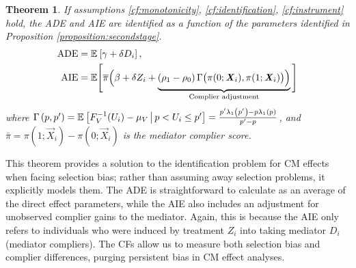 \newtheorem{theoremCF}{Theorem}
\renewcommand\thetheoremCF{CF}
\begin{theoremCF}
    \label{thm:cf-identification}
    If assumptions \ref{cf:monotonicity}, \ref{cf:identification}, \ref{cf:instrument} hold, the ADE and AIE are identified as a function of the parameters identified in Proposition \ref{proposition:secondstage}.
    \begin{align*}
    \text{ADE}
        &= \mathbb{E}_{} \left[ \gamma + \delta D_i \right], \\
    \text{AIE}
        &= \mathbb E \Bigg[ \overline{\pi}
            \Big( \beta +  \delta Z_i +
                \underbrace{ (\rho_1 - \rho_0) \,
                \Gamma \big(\pi(0; \boldsymbol{\mathit{X}}_i), \pi(1; \boldsymbol{\mathit{X}}_i) \big)\Big)}_{
                    \text{Complier adjustment}} \Bigg]
    \end{align*}
    where $\Gamma\left(p,p'\right) 
    = \mathbb{E}_{} \left[  F^{-1}_V(U_i) - \mu_V \, \middle\vert \, p < U_i \leq p' \right]
    = \frac{p'\lambda_1\left(p'\right) - p\lambda_1\left(p\right)}{p' - p}$, and $\bar\pi = \pi(1; \vec X_i) - \pi(0; \vec X_i)$ is the mediator complier score.
\end{theoremCF}

This theorem provides a solution to the identification problem for CM effects when facing selection bias;
rather than assuming away selection problems, it explicitly models them.
The ADE is straightforward to calculate as an average of the direct effect parameters, while the AIE also includes an adjustment for unobserved complier gains to the mediator.
Again, this is because the AIE only refers to individuals who were induced by treatment $Z_i$ into taking mediator $D_i$ (mediator compliers).
The CFs allow us to measure both selection bias and complier differences, purging persistent bias in CM effect analyses.

